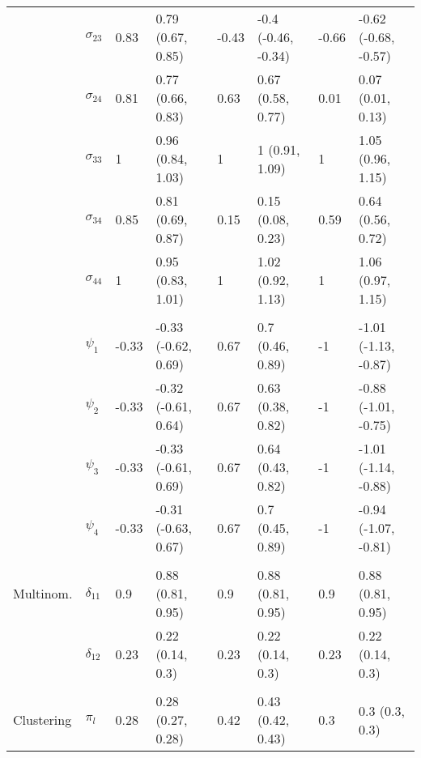 \documentclass[useAMS,referee]{biom}
\begin{document}
\begin{table}[t]
\begin{tabular}{llllllll}
\hspace{1em} & $\sigma_{23}$ & 0.83 & 0.79 (0.67, 0.85) & -0.43 & -0.4 (-0.46, -0.34) & -0.66 & -0.62 (-0.68, -0.57)\\
\hspace{1em} & $\sigma_{24}$ & 0.81 & 0.77 (0.66, 0.83) & 0.63 & 0.67 (0.58, 0.77) & 0.01 & 0.07 (0.01, 0.13)\\
\hspace{1em} & $\sigma_{33}$ & 1 & 0.96 (0.84, 1.03) & 1 & 1 (0.91, 1.09) & 1 & 1.05 (0.96, 1.15)\\
\hspace{1em} & $\sigma_{34}$ & 0.85 & 0.81 (0.69, 0.87) & 0.15 & 0.15 (0.08, 0.23) & 0.59 & 0.64 (0.56, 0.72)\\
\hspace{1em} & $\sigma_{44}$ & 1 & 0.95 (0.83, 1.01) & 1 & 1.02 (0.92, 1.13) & 1 & 1.06 (0.97, 1.15)\\
\addlinespace[0.3em]
\multicolumn{8}{l}{\textbf{ }}\\
\hspace{1em} & $\psi_{1}$ & -0.33 & -0.33 (-0.62, 0.69) & 0.67 & 0.7 (0.46, 0.89) & -1 & -1.01 (-1.13, -0.87)\\
\hspace{1em} & $\psi_{2}$ & -0.33 & -0.32 (-0.61, 0.64) & 0.67 & 0.63 (0.38, 0.82) & -1 & -0.88 (-1.01, -0.75)\\
\hspace{1em} & $\psi_{3}$ & -0.33 & -0.33 (-0.61, 0.69) & 0.67 & 0.64 (0.43, 0.82) & -1 & -1.01 (-1.14, -0.88)\\
\hspace{1em} & $\psi_{4}$ & -0.33 & -0.31 (-0.63, 0.67) & 0.67 & 0.7 (0.45, 0.89) & -1 & -0.94 (-1.07, -0.81)\\
\addlinespace[0.3em]
\multicolumn{8}{l}{\textbf{ }}\\
\hspace{1em}Multinom. & $\delta_{11}$ & 0.9 & 0.88 (0.81, 0.95) & 0.9 & 0.88 (0.81, 0.95) & 0.9 & 0.88 (0.81, 0.95)\\
\hspace{1em} & $\delta_{12}$ & 0.23 & 0.22 (0.14, 0.3) & 0.23 & 0.22 (0.14, 0.3) & 0.23 & 0.22 (0.14, 0.3)\\
\addlinespace[0.3em]
\multicolumn{8}{l}{\textbf{ }}\\
\hspace{1em}Clustering & $\pi_l$ & 0.28 & 0.28 (0.27, 0.28) & 0.42 & 0.43 (0.42, 0.43) & 0.3 & 0.3 (0.3, 0.3)\\
\bottomrule
\end{tabular}
\end{table}
\end{document}
